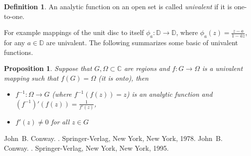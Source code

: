 \documentclass[12pt]{article}
\theoremstyle{theorem}
\newtheorem*{prop}{Proposition}
\theoremstyle{definition}
\newtheorem*{defn}{Definition}
\theoremstyle{remark}
\begin{document}
\begin{defn}
An analytic function on an open set is called {\em univalent} if it is one-to-one.
\end{defn}

For example mappings of the unit disc to itself $\phi_a : {\mathbb{D}} \rightarrow {\mathbb{D}}$, where
$\phi_a(z) = \frac{z-a}{1 - \bar{a}z}$, for any $a \in {\mathbb{D}}$ are univalent.
The following  summarizes some
basic  of univalent functions.

\begin{prop}
Suppose that $G,\Omega \subset {\mathbb{C}}$ are regions and
$f \colon G \to \Omega$ is a univalent mapping such that $f(G) = \Omega$ (it
is onto), then
\begin{itemize}
\item $f^{-1} \colon \Omega \to G$ (where $f^{-1}(f(z)) = z$) is an analytic
function and $(f^{-1})'(f(z)) = \frac{1}{f'(z)}$,
\item $f'(z) \not= 0$ for all $z \in G$
\end{itemize}
\end{prop}

\begin{thebibliography}{9}
John~B. Conway.
{\em {}}.
Springer-Verlag, New York, New York, 1978.
John~B. Conway.
{\em {}}.
Springer-Verlag, New York, New York, 1995.
\end{thebibliography}
\end{document}
